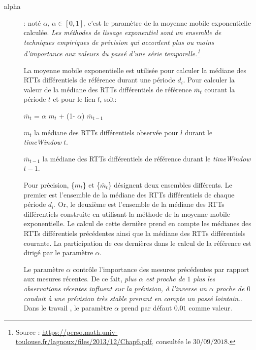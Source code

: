 \begin{description}
\item[alpha ]: noté $\alpha$,  $\alpha \in [0, 1]$, c'est le paramètre de la  moyenne mobile exponentielle calculée.
\guillemotleft \textit{ Les méthodes de lissage exponentiel  sont un ensemble de techniques empiriques de prévision qui accordent plus ou moins d'importance aux valeurs du passé d'une série temporelle.\footnote{Source : \url{https://perso.math.univ-toulouse.fr/lagnoux/files/2013/12/Chap6.pdf}, consultée le $30/09/2018.$}} \guillemotright

 La  moyenne mobile exponentielle est utilisée pour calculer la médiane des RTTs différentiels de référence durant une période $d_i$.
Pour calculer la  valeur de la médiane des RTTs différentiels de référence $ \overline{m}_{t}$   courant la période $ t $ et pour le lien $l$, soit:

\begin{center}
	$ \overline{m}_{t}$ =  $\alpha$ ${m}_{t}$ + (1-  $\alpha$) $ \overline{m}_{t-1}$
\end{center} 

$m_t$ la médiane des RTTs différentiels observée pour $l$ durant le \textit{timeWindow} $t$. 

$ \overline{m}_{t-1}$  la médiane des  RTTs différentiels  de référence durant le \textit{timeWindow} $ t-1 $.  



Pour précision, \{$m_t$\} et \{$ \overline{m}_{t}$\} désignent deux ensembles différents. Le premier est l'ensemble de la médiane des RTTs différentiels de chaque période $d_i$. Or, le deuxième est l'ensemble de la médiane des RTTs différentiels construite en utilisant la méthode de la moyenne mobile exponentielle. Le calcul de cette dernière prend en compte les médianes des RTTs différentiels précédentes ainsi que la médiane des RTTs différentiels courante. La participation de ces dernières dans le calcul de la référence est dirigé par le paramètre $\alpha$. 



Le paramètre $\alpha$  contrôle l'importance  des mesures précédentes par rapport aux mesures récentes. De ce fait, \guillemotleft \textit{plus $\alpha$ est proche de $ 1 $ plus les observations récentes influent sur la prévision, à l'inverse un $\alpha$ proche de $0$ conduit à une prévision très stable prenant en compte un passé lointain}.\guillemotright\cite{Lissages-Exponentiels}.  Dans le travail \cite{DBLP:journals/corr/FontugneAPB16}, le paramètre $\alpha$  prend par défaut $0.01$ comme valeur.



\end{description}
